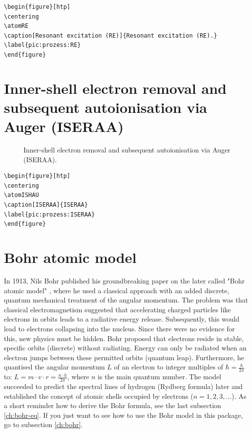 \documentclass[
	a4paper,
	parskip=half,
    pagesize=auto,      		%
    listof=totoc,   		%
    bibliography=totoc,
	11pt
]{scrartcl}
\begin{document}
\begin{lstlisting}
\begin{figure}[htp]
\centering
\atomRE
\caption[Resonant excitation (RE)]{Resonant excitation (RE).}
\label{pic:prozess:RE}
\end{figure}
\end{lstlisting}




\section{Inner-shell electron removal and subsequent autoionisation via Auger (ISERAA)}

\begin{figure}[htp]
\centering
\atomISHAU
\caption[Inner-shell electron removal and subsequent autoionisation via Auger (ISERAA)]{Inner-shell electron removal and subsequent autoionisation via Auger (ISERAA).}
\label{pic:prozess:RE}
\end{figure}

\begin{lstlisting}
\begin{figure}[htp]
\centering
\atomISHAU
\caption[ISERAA]{ISERAA}
\label{pic:prozess:ISERAA}
\end{figure}
\end{lstlisting}

\clearpage
\section{Bohr atomic model}

In 1913, Nils Bohr published his groundbreaking paper on the later called "Bohr atomic model" \cite{bohr1913}, where he used a classical approach with an added discrete, quantum mechanical treatment of the angular momentum. 
The problem was that classical electromagnetism suggested that accelerating charged particles like electrons in orbits leads to a radiative energy release. Subsequently, this would lead to electrons collapsing into the nucleus. 
Since there were no evidence for this, new physics must be hidden. 
Bohr proposed that electrons reside in stable, specific orbits (discrete) without radiating. Energy can only be radiated when an electron jumps between these permitted orbits (quantum leap). 
Furthermore, he quantised the angular momentum $L$ of an electron to integer multiples of $\hbar = \frac{h}{2 \pi}$ to: $L = m \cdot v \cdot r = \frac{n \cdot h}{2 \pi}$, where $n$ is the main quantum number. 
The model succeeded to predict the spectral lines of hydrogen (Rydberg formula) later and established the concept of atomic shells occupied by electrons ($n = 1,2,3,\ldots$).
As a short reminder how to derive the Bohr formula, see the last subsection \ref{ch:bohr-eq}.
If you just want to see how to use the Bohr model in this package, go to subsection \ref{ch:bohr}.
\end{document}
